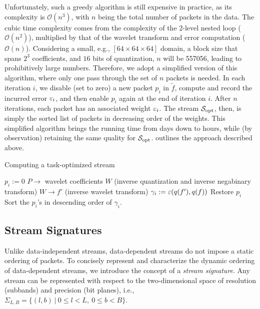 Unfortunately, such a greedy algorithm is still expensive in practice, as its complexity is
$\mathcal{O}(n^3)$, with $n$ being the total number of packets in the data. The cubic time
complexity comes from the complexity of the 2-level nested loop ($\mathcal{O}(n^2)$), multiplied by
that of the wavelet transform and error computation ($\mathcal{O}(n)$). Considering a small, e.g.,
$[64 \times 64 \times 64]$ domain, a block size that spans $2^3$ coefficients, and $16$ bits of
quantization, $n$ will be 557056, leading to prohibitively large numbers. Therefore, we adopt a
simplified version of this algorithm, where only one pass through the set of $n$ packets is needed.
In each iteration $i$, we disable (set to zero) a new packet $p_i$ in $\tilde{f}$, compute and
record the incurred error $\err_i$, and then enable $p_i$ again at the end of iteration $i$. After
$n$ iterations, each packet has an associated weight $\err_i$. The stream $\sopt$, then, is simply
the sorted list of packets in decreasing order of the weights. This simplified algorithm brings the
running time from days down to hours, while (by observation) retaining the same quality for $\sopt$.
 outlines the approach described above.

\begin{algorithm}[h]
  \caption{Computing a task-optimized stream}
  \begin{algorithmic}[1]
			\State $p_i := 0$
      \State $P \rightarrow$ wavelet coefficients $W$ (inverse quantization and inverse negabinary transform)
			\State $W \rightarrow f'$ (inverse wavelet transform)
			\State $\gamma_i := \err(q(f'),q(f))$			
			\State Restore $p_i$
		\EndFor
		\State Sort the $p_i$'s in descending order of $\gamma_i$.
	\end{algorithmic}
	\label{alg:greedy}
\end{algorithm}

\subsection{Stream Signatures} \label{sec:stream-signature}
Unlike data-independent streams, data-dependent streams do not impose a static ordering of packets.
To concisely represent and characterize the dynamic ordering of data-dependent streams, we introduce
the concept of a \emph{stream signature}. Any stream can be represented with respect to the
two-dimensional space of resolution (subbands) and precision (bit planes), i.e., \mbox{$
\Sigma_{L,B}=\{(l,b)\ |\ 0\leq l < L,\ 0\leq b < B\}$.}

